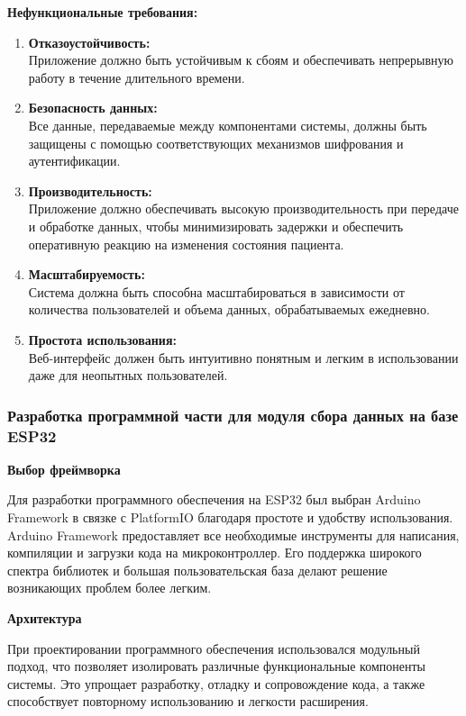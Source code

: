 \documentclass[12pt, russian]{extarticle}
\begin{document}
\begin{spacing}{1.5}
\noindent
\textbf{Нефункциональные требования:}

\begin{enumerate}
    \item \textbf{Отказоустойчивость:} \\
        Приложение должно быть устойчивым к сбоям и обеспечивать непрерывную работу в течение длительного времени.
    \item \textbf{Безопасность данных:} \\
        Все данные, передаваемые между компонентами системы, должны быть защищены с помощью соответствующих механизмов шифрования и аутентификации.
    \item \textbf{Производительность:} \\
        Приложение должно обеспечивать высокую производительность при передаче и обработке данных, чтобы минимизировать задержки и обеспечить оперативную реакцию на изменения состояния пациента.
    \item \textbf{Масштабируемость:} \\
        Система должна быть способна масштабироваться в зависимости от количества пользователей и объема данных, обрабатываемых ежедневно.
    \item \textbf{Простота использования:} \\
        Веб-интерфейс должен быть интуитивно понятным и легким в использовании даже для неопытных пользователей.
\end{enumerate}

\subsubsection{Разработка программной части для модуля сбора данных на базе ESP32}

\par \noindent \textbf{Выбор фреймворка}

Для разработки программного обеспечения на ESP32 был выбран Arduino Framework в связке с PlatformIO благодаря простоте и удобству использования. Arduino Framework предоставляет все необходимые инструменты для написания, компиляции и загрузки кода на микроконтроллер. Его поддержка широкого спектра библиотек и большая пользовательская база делают решение возникающих проблем более легким.

\par \noindent \textbf{Архитектура}

При проектировании программного обеспечения использовался модульный подход, что позволяет изолировать различные функциональные компоненты системы. Это упрощает разработку, отладку и сопровождение кода, а также способствует повторному использованию и легкости расширения.


\end{spacing}
\end{document}
